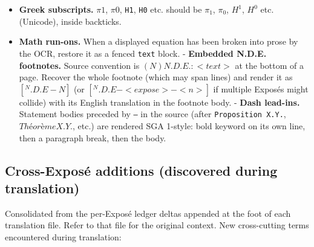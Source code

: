 \documentclass[
]{article}
\providecommand{\tightlist}{%
  \setlength{\itemsep}{0pt}\setlength{\parskip}{0pt}}
\begin{document}
\begin{itemize}
  \begin{itemize}
  \tightlist
  \item
    \(Et(X)\) should be \(\hat{E}t(X)\) (the étale site / category of
    étale objects).
  \item
    \texttt{etale} should be \texttt{étale}.
  \item
    \texttt{Tohoku} should be \emph{Tôhoku}.
  \end{itemize}
\item
  \textbf{Greek subscripts.} \(\pi 1\), \(\pi 0\), \texttt{H1},
  \texttt{H0} etc. should be \(\pi_{1}\), \(\pi_{0}\), \(H^{1}\),
  \(H^{0}\) etc. (Unicode), inside backticks.
\item
  \textbf{Math run-ons.} When a displayed equation has been broken into
  prose by the OCR, restore it as a fenced
  \texttt{\textasciigrave{}\textasciigrave{}\textasciigrave{}text}
  block. - \textbf{Embedded N.D.E. footnotes.} Source convention is
  \((N) N.D.E. : <text>\) at the bottom of a page. Recover the whole
  footnote (which may span lines) and render it as \([{}^{N}.D.E-N]\)
  (or \([{}^{N}.D.E-<expose>-<n>]\) if multiple Exposés might collide)
  with its English translation in the footnote body. - \textbf{Dash
  lead-ins.} Statement bodies preceded by \texttt{—} in the source
  (after \texttt{Proposition\ X.Y.}, \(Théorème X.Y.\),
  etc.) are rendered SGA 1-style: bold keyword on its own line, then a
  paragraph break, then the body.
\end{itemize}

\subsection{Cross-Exposé additions (discovered during
translation)}\label{cross-exposuxe9-additions-discovered-during-translation}

Consolidated from the per-Exposé ledger deltas appended at the foot of
each translation file. Refer to that file for the original context. New
cross-cutting terms encountered during translation:
\end{document}
